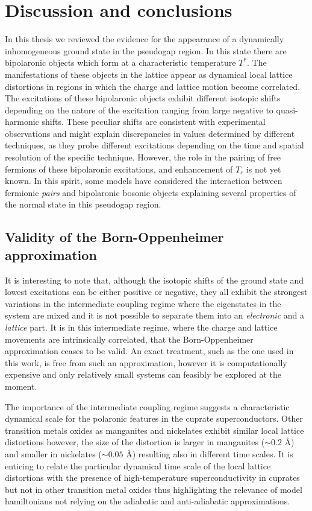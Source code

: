 \chapter{Discussion and conclusions}
\label{chap:conclusions}

In this thesis we reviewed the evidence for the appearance of a dynamically inhomogeneous ground state in the pseudogap region. 
In this state there are bipolaronic objects which form at a characteristic temperature $T^*$. 
The manifestations of these objects in the lattice appear as dynamical local lattice distortions in regions in which the charge and lattice motion become correlated. 
The excitations of these bipolaronic objects exhibit different isotopic shifts depending on the nature of the excitation ranging from large negative to quasi-harmonic shifts. 
These peculiar shifts are consistent with experimental observations and might explain discrepancies in values determined by different techniques, as they probe different excitations depending on the time and spatial resolution of the specific technique. 
However, the role in the pairing of free fermions of these bipolaronic excitations, and enhancement of $T_c$ is not yet known. 
In this spirit, some models have considered the interaction between fermionic \textit{pairs} and bipolaronic bosonic objects \cite{Bussmann-Holder2005,Mihailovic2001,Bar-Yam1991,Bianconi2000} explaining several properties of the normal state in this pseudogap region. 

\section{Validity of the Born-Oppenheimer approximation}

It is interesting to note that, although the isotopic shifts of the ground state and lowest excitations can be either positive or negative, they all exhibit the strongest variations in the intermediate coupling regime where the eigenstates in the system are mixed and it is not possible to separate them into an \textit{electronic} and a \textit{lattice} part.
It is in this intermediate regime, where the charge and lattice movements are intrinsically correlated, that the Born-Oppenheimer approximation ceases to be valid.
An exact treatment, such as the one used in this work, is free from such an approximation, however it is computationally expensive and  only relatively small systems can feasibly be explored at the moment.

The importance of the intermediate coupling regime suggests a characteristic dynamical scale for the polaronic features in the cuprate superconductors. 
Other transition metals oxides as manganites and nickelates exhibit similar local lattice distortions however, the size of the distortion is larger in manganites ($\sim 0.2$ \AA) \cite{Tyson1996} and smaller in nickelates ($\sim 0.05$ \AA) \cite{Acosta-Alejandro2008} resulting also in different time scales. 
It is enticing to relate the particular dynamical time scale of the local lattice distortions with the presence of high-temperature superconductivity in cuprates but not in other transition metal oxides thus highlighting the relevance of model hamiltonians not relying on the adiabatic and anti-adiabatic approximations.

